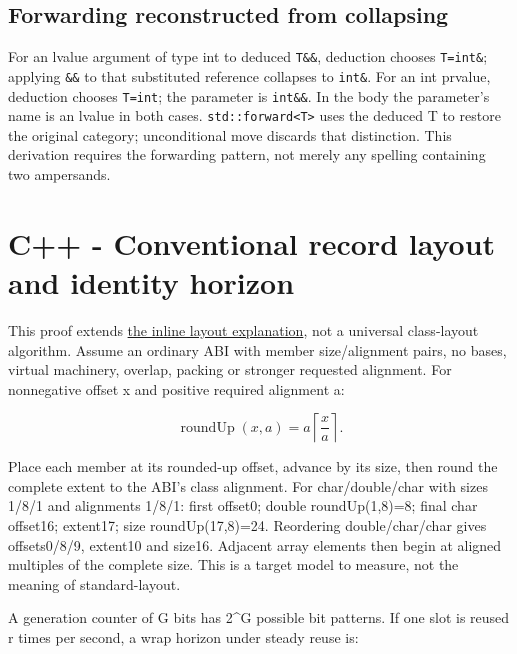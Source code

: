 \subsection{Forwarding reconstructed from collapsing}\label{01-foundations-i-ch011-forwarding-reconstructed-from-collapsing}

\hypertarget{01-foundations-i-ch011-forwarding-reconstructed-from-collapsing}{}

For an lvalue argument of type int to deduced \texttt{T\&\&}, deduction chooses \texttt{T=int\&}; applying \texttt{\&\&} to that substituted reference collapses to \texttt{int\&}. For an int prvalue, deduction chooses \texttt{T=int}; the parameter is \texttt{int\&\&}. In the body the parameter's name is an lvalue in both cases. \texttt{std::forward\textless{}T\textgreater{}} uses the deduced T to restore the original category; unconditional move discards that distinction. This derivation requires the forwarding pattern, not merely any spelling containing two ampersands.

\section{C++ - Conventional record layout and identity horizon}\label{01-foundations-i-ch011-c---conventional-record-layout-and-identity-horizon}

\hypertarget{01-foundations-i-ch011-c---conventional-record-layout-and-identity-horizon}{}

This proof extends \hyperref[01-foundations-i-ch003-bringing-the-object-model-back-to-bytes]{the inline layout explanation}, not a universal class-layout algorithm. Assume an ordinary ABI with member size/alignment pairs, no bases, virtual machinery, overlap, packing or stronger requested alignment. For nonnegative offset x and positive required alignment a:

\[
\operatorname{roundUp}(x,a)=a\left\lceil\frac{x}{a}\right\rceil.
\]

Place each member at its rounded-up offset, advance by its size, then round the complete extent to the ABI's class alignment. For char/double/char with sizes 1/8/1 and alignments 1/8/1: first offset0; double roundUp(1,8)=8; final char offset16; extent17; size roundUp(17,8)=24. Reordering double/char/char gives offsets0/8/9, extent10 and size16. Adjacent array elements then begin at aligned multiples of the complete size. This is a target model to measure, not the meaning of standard-layout.

A generation counter of G bits has 2\^{}G possible bit patterns. If one slot is reused r times per second, a wrap horizon under steady reuse is:

